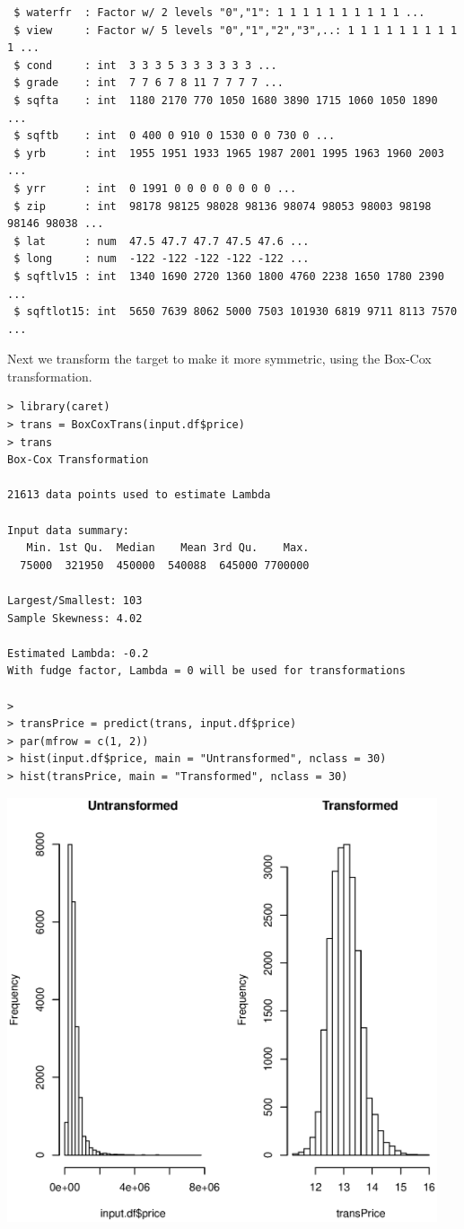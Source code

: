 \documentclass{article}%
\begin{document}
\begin{verbatim}
 $ waterfr  : Factor w/ 2 levels "0","1": 1 1 1 1 1 1 1 1 1 1 ...
 $ view     : Factor w/ 5 levels "0","1","2","3",..: 1 1 1 1 1 1 1 1 1 1 ...
 $ cond     : int  3 3 3 5 3 3 3 3 3 3 ...
 $ grade    : int  7 7 6 7 8 11 7 7 7 7 ...
 $ sqfta    : int  1180 2170 770 1050 1680 3890 1715 1060 1050 1890 ...
 $ sqftb    : int  0 400 0 910 0 1530 0 0 730 0 ...
 $ yrb      : int  1955 1951 1933 1965 1987 2001 1995 1963 1960 2003 ...
 $ yrr      : int  0 1991 0 0 0 0 0 0 0 0 ...
 $ zip      : int  98178 98125 98028 98136 98074 98053 98003 98198 98146 98038 ...
 $ lat      : num  47.5 47.7 47.7 47.5 47.6 ...
 $ long     : num  -122 -122 -122 -122 -122 ...
 $ sqftlv15 : int  1340 1690 2720 1360 1800 4760 2238 1650 1780 2390 ...
 $ sqftlot15: int  5650 7639 8062 5000 7503 101930 6819 9711 8113 7570 ...
\end{verbatim}
Next we transform the target to make it more symmetric, using the Box-Cox transformation.
\begin{verbatim}
> library(caret)
> trans = BoxCoxTrans(input.df$price)
> trans
Box-Cox Transformation

21613 data points used to estimate Lambda

Input data summary:
   Min. 1st Qu.  Median    Mean 3rd Qu.    Max.
  75000  321950  450000  540088  645000 7700000

Largest/Smallest: 103
Sample Skewness: 4.02

Estimated Lambda: -0.2
With fudge factor, Lambda = 0 will be used for transformations

>
> transPrice = predict(trans, input.df$price)
> par(mfrow = c(1, 2))
> hist(input.df$price, main = "Untransformed", nclass = 30)
> hist(transPrice, main = "Transformed", nclass = 30)
\end{verbatim}
\includegraphics[width=\textwidth, height = 12.5cm]{Symmetric.eps}
\end{document}
